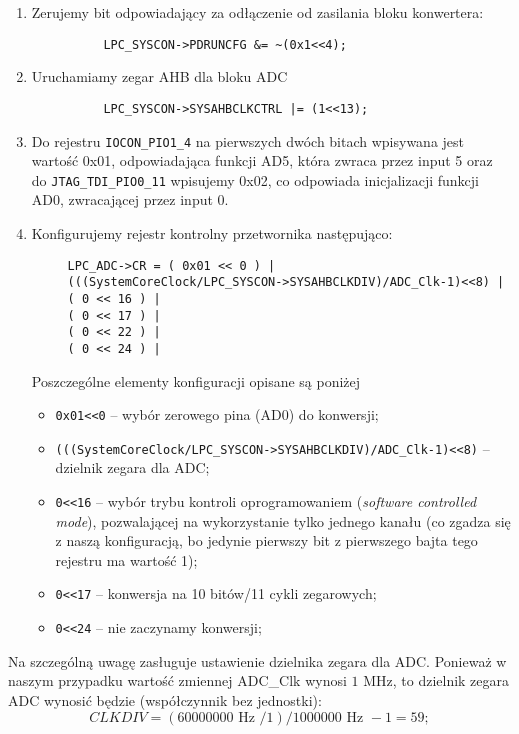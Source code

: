 \documentclass[a4paper,12pt,twoside]{article}
\theoremstyle{plain}
\theoremstyle{definition}
\theoremstyle{remark}
\begin{document}
\begin{enumerate}
	\item Zerujemy bit odpowiadający za odłączenie od zasilania bloku konwertera:
		\begin{verbatim}
		  LPC_SYSCON->PDRUNCFG &= ~(0x1<<4);
		\end{verbatim}
	\item Uruchamiamy zegar AHB dla bloku ADC
		\begin{verbatim}
		  LPC_SYSCON->SYSAHBCLKCTRL |= (1<<13);
		\end{verbatim}
	\item Do rejestru \verb|IOCON_PIO1_4| na pierwszych dwóch bitach wpisywana jest wartość 0x01, odpowiadająca funkcji AD5, która zwraca przez input 5 \cite{INST} oraz do \verb|JTAG_TDI_PIO0_11| wpisujemy 0x02, co odpowiada inicjalizacji funkcji AD0, zwracającej przez input 0.
	
	\item Konfigurujemy rejestr kontrolny przetwornika następująco:
	\begin{verbatim}
	 LPC_ADC->CR = ( 0x01 << 0 ) |  
	 (((SystemCoreClock/LPC_SYSCON->SYSAHBCLKDIV)/ADC_Clk-1)<<8) |
	 ( 0 << 16 ) | 		
	 ( 0 << 17 ) |  		
	 ( 0 << 22 ) |  		
	 ( 0 << 24 ) |  		
	\end{verbatim}
	Poszczególne elementy konfiguracji opisane są poniżej
	\begin{itemize}
		\item \verb|0x01<<0| -- wybór zerowego pina (AD0) do konwersji;
		\item \verb|(((SystemCoreClock/LPC_SYSCON->SYSAHBCLKDIV)/ADC_Clk-1)<<8)| --  dzielnik zegara dla ADC;
		\item \verb|0<<16| -- wybór trybu kontroli oprogramowaniem (\textit{software controlled mode}), pozwalającej na wykorzystanie tylko jednego kanału (co zgadza się z naszą konfiguracją, bo jedynie pierwszy bit z pierwszego bajta tego rejestru ma wartość 1);
		\item \verb|0<<17| -- konwersja na 10 bitów/11 cykli zegarowych;
		\item \verb|0<<24| -- nie zaczynamy konwersji;
	\end{itemize}
\end{enumerate}
Na szczególną uwagę zasługuje ustawienie dzielnika zegara dla ADC. Ponieważ w naszym przypadku wartość zmiennej ADC\_Clk wynosi $1$ MHz, to dzielnik zegara ADC wynosić będzie (współczynnik bez jednostki):
\[
CLKDIV = ( 60 000 000 \textrm{ Hz }/ 1 ) / 1000000\textrm{ Hz } - 1 = 59;
\]
\end{document}
